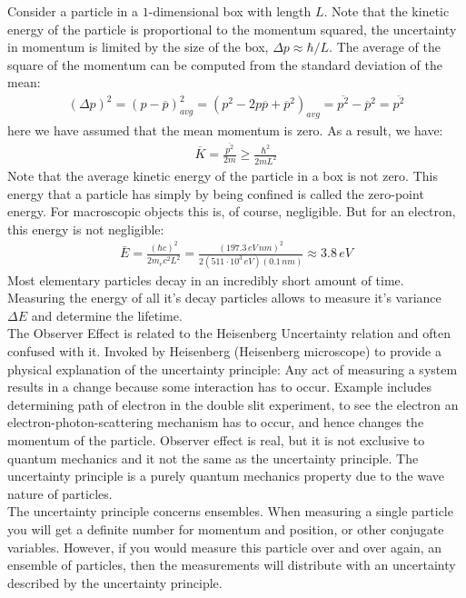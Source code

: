 \documentclass[11pt]{article}
\theoremstyle{break}
\theoremstyle{break}
\newcommand{\ee}[1]{\cdot 10^{#1}}
\begin{document}
Consider a particle in a $1$-dimensional box with length $L$. Note that the kinetic energy of the particle is proportional to the momentum squared, the uncertainty in momentum is limited  by the size of the box, $\Delta p \approx \hbar/L$. The average of the square of the momentum can be computed from the standard deviation of the mean:
\begin{align*}
(\Delta p)^2 = (p - \overline{p})^2_{avg} = (p^2 - 2p\overline{p}+\overline{p}^2)_{avg} = \overline{p^2}-\overline{p}^2 = \overline{p^2}
\end{align*}
here we have assumed that the mean momentum is zero. As a result, we have:
\begin{align*}
\overline{K} = \frac{\overline{p^2}}{2m} \geq \frac{\hbar^2}{2mL^2}
\end{align*}
Note that the average kinetic energy of the particle in a box is not zero. This energy that a particle has simply by being confined is called the zero-point energy. For macroscopic objects this is, of course, negligible. But for an electron, this energy is not negligible:
\begin{align*}
\bar{E} = \frac{(\hbar c)^2}{2m_e c^2 L^2}= \frac{(197.3\, eV\, nm)^2}{2(511\ee{3}\, eV) (0.1\, nm)}\approx 3.8\, eV
\end{align*}
Most elementary particles decay in an incredibly short amount of time. Measuring the energy of all it's decay particles allows to measure it's variance $\Delta E$ and determine the lifetime.\\

The Observer Effect is related to the Heisenberg Uncertainty relation and often confused with it. Invoked by Heisenberg (Heisenberg microscope) to provide a physical explanation of the uncertainty principle:
Any act of measuring a system results in a change because some interaction has to occur.
Example includes determining path of electron in the double slit experiment, to see the electron an electron-photon-scattering mechanism has to occur, and hence changes the momentum of the particle. Observer effect is real, but it is not exclusive to quantum mechanics and it not the same as the uncertainty principle. The uncertainty principle is a purely quantum mechanics property due to the wave nature of particles.\\

The uncertainty principle concerns ensembles. When measuring a single particle you will get a definite number for momentum and position, or other conjugate variables. However, if you would measure this particle over and over again, an ensemble of particles, then the measurements will distribute with an uncertainty described by the uncertainty principle.\\
\end{document}
